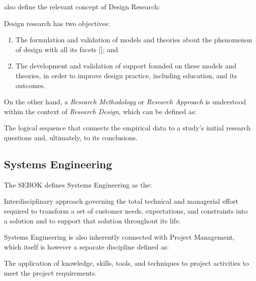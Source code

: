 \documentclass[a4paper,nobib,justified,final]{tufte-book}
\begin{document}
\citeauthor{blessingDRMDesignResearch2009} \cite{blessingDRMDesignResearch2009} also define the relevant concept of Design Research:
\begin{definition}
	Design research has two objectives:
	\begin{enumerate}
		\item The formulation and validation of models and theories about the phenomenon of design with all its facets [\textellipsis]; and 
		\item The development and validation of support founded on these models and theories, in order to improve design practice, including education, and its outcomes. \cite{blessingDRMDesignResearch2009}
	\end{enumerate}
	\label{def:design_research}
\end{definition}

On the other hand, a \emph{Research Methodology} or \emph{Research Approach} is understood within the context of \emph{Research Design}, which can be defined as:
\begin{definition}
	The logical sequence that connects the empirical data to a study's initial research questions and, ultimately, to its conclusions. \cite[20]{yinCaseStudyResearch2014}
\end{definition}


\subsection{Systems Engineering}

The \acf{SEBOK} defines Systems Engineering as the:
\begin{definition}
	Interdisciplinary approach governing the total technical and managerial effort required to transform a set of customer needs, expectations, and constraints into a solution and to support that solution throughout its life. \cite{sebok_book_213}
\end{definition}

Systems Engineering is also inherently connected with Project Management, which itself is however a separate discipline defined as:
\begin{definition}
	The application of knowledge, skills, tools, and techniques to project activities to meet the project requirements. \cite{projectmanagementinstituteGuideProjectManagement2021}
\end{definition}
\end{document}
